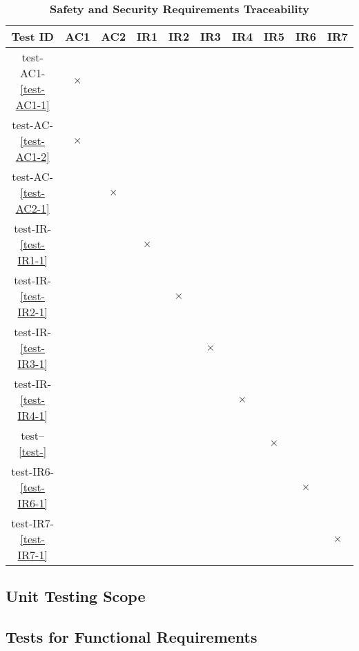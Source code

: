 \documentclass[12pt, titlepage]{article}
\begin{document}
\begin{landscape}
\begin{table} [H]
  \centering
  \begin{tabular}{|c|c|c|c|c|c|c|c|c|c|}
  \hline
  Test ID & AC1 & AC2 & IR1 & IR2 & IR3 & IR4 & IR5 & IR6 & IR7 \\
  \hline
  test-AC1-\ref{test-AC1-1} & $\times$ & & & & & & & & \\
  \hline
  test-AC-\ref{test-AC1-2} & $\times$ & & & & & & & & \\
  \hline
  test-AC-\ref{test-AC2-1} & & $\times$ & & & & & & & \\
  \hline
  test-IR-\ref{test-IR1-1} & & & $\times$ & & & & & &  \\
  \hline
  test-IR-\ref{test-IR2-1}  & & & & $\times$ & & & & & \\
  \hline
  test-IR-\ref{test-IR3-1}  & & & & & $\times$ & & & & \\
  \hline
  test-IR-\ref{test-IR4-1}  & & & & & & $\times$ & & & \\
  \hline
  test--\ref{test-}  & & & & & & & $\times$ & & \\
  \hline
  test-IR6-\ref{test-IR6-1}  & & & & & & & & $\times$ & \\
  \hline
  test-IR7-\ref{test-IR7-1}  & & & & & & & & & $\times$ \\
  \hline
\end{tabular}
\caption{\bf Safety and Security Requirements Traceability} \label{tab:sns-test-traceability}
\end{table}

\end{landscape}
\newpage




\subsection{Unit Testing Scope}


\subsection{Tests for Functional Requirements}
\end{document}
